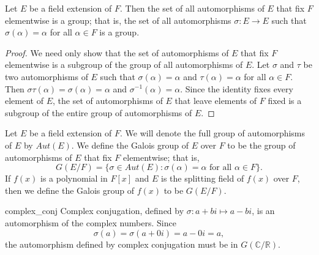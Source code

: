 \begin{proposition}
Let $E$ be a field extension of $F$.  Then the set of all automorphisms of $E$ that fix $F$ elementwise is a group; that is, the set of all automorphisms $\sigma : E \rightarrow E$ such that $\sigma( \alpha ) =
\alpha$ for all $\alpha \in F$ is a group.  
\end{proposition}

\begin{proof}
We need only show that the set of automorphisms of $E$ that fix $F$ elementwise is a subgroup of the group of all automorphisms of $E$.  Let $\sigma$ and $\tau$ be two automorphisms of $E$ such that $\sigma( \alpha ) = \alpha$ and $\tau( \alpha ) = \alpha$ for all $\alpha \in F$.  Then $\sigma \tau( \alpha ) = \sigma( \alpha) = \alpha$ and  $\sigma^{-1}( \alpha ) = \alpha$.   Since the identity fixes every  element of $E$, the set of automorphisms of $E$ that leave elements of  $F$ fixed is a subgroup of the entire group of automorphisms of $E$. 
\end{proof}

\medskip

Let $E$ be a field extension of $F$.  We will denote the full group of automorphisms of $E$ by $Aut(E)$.  We define the {\bfi Galois group\/} of $E$ over $F$ to be
the group of automorphisms of $E$ that fix $F$ elementwise; that is,
\[
G(E/F)\label{notegalois} = \{ \sigma \in Aut(E) : \sigma(\alpha)
=
\alpha \mbox{ for all $\alpha \in F$} \}.
\] 
If $f(x)$ is a polynomial in $F[x]$ and $E$ is the splitting field of $f(x)$ over $F$, then we define the Galois group of $f(x)$ to be $G(E/F)$. 


\begin{example}{complex_conj}
Complex conjugation, defined by $\sigma : a + bi \mapsto a - bi$, is an automorphism of the complex numbers.  Since 
\[
\sigma(a) = \sigma(a + 0i) = a - 0i = a,
\]
the automorphism defined by complex conjugation must be in $G( {\mathbb C} / {\mathbb R} )$. 
\end{example}


